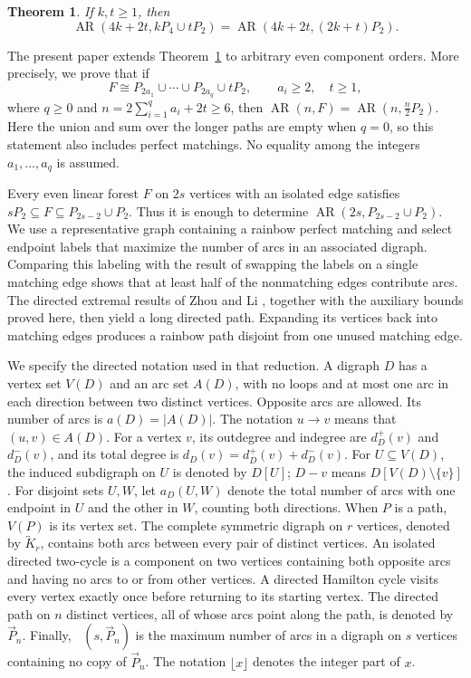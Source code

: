 \documentclass[12pt]{article}
\newtheorem{theorem}{Theorem}[section]
\DeclareMathOperator{\AR}{AR}
\DeclareMathOperator{\exdir}{ex_{dir}}
\newcommand{\dP}{\overrightarrow{P}}
\newcommand{\sK}{\overleftrightarrow{K}}
\begin{document}
\begin{theorem}{\rm\cite{GJJLP}}\label{lem:published-p4}
If $k,t\ge1$, then
\[
 \AR(4k+2t,kP_4\cup tP_2)=\AR(4k+2t,(2k+t)P_2).
\]
\end{theorem}

The present paper extends Theorem~\ref{lem:published-p4} to arbitrary even
component orders. More precisely, we prove that if
\[
 F\cong P_{2a_1}\cup\cdots\cup P_{2a_q}\cup tP_2,
 \qquad a_i\ge2,\quad t\ge1,
\]
where $q\ge0$ and $n=2\sum_{i=1}^{q}a_i+2t\ge6$, then
$\AR(n,F)=\AR(n,\frac{n}{2}P_2)$. Here the union and sum over the longer
paths are empty when $q=0$, so this statement also includes perfect
matchings. No equality among the integers $a_1,\ldots,a_q$ is assumed.

Every even linear forest $F$ on $2s$ vertices with an isolated edge satisfies
$sP_2\subseteq F\subseteq P_{2s-2}\cup P_2$. Thus it is enough to determine
$\AR(2s,P_{2s-2}\cup P_2)$. We use a representative graph containing a
rainbow perfect matching and select endpoint labels that maximize the
number of arcs in an associated digraph. Comparing this labeling with
the result of swapping the labels on a single matching edge shows that
at least half of the nonmatching edges contribute arcs. The directed
extremal results of Zhou and Li \cite{ZL}, together with the auxiliary
bounds proved here, then yield a long directed path. Expanding its
vertices back into matching edges produces a rainbow path disjoint
from one unused matching edge.

We specify the directed notation used in that reduction. A digraph $D$
has a vertex set $V(D)$ and an arc set $A(D)$, with no loops and at most
one arc in each direction between two distinct vertices. Opposite arcs
are allowed. Its number of arcs is $a(D)=|A(D)|$.
The notation $u\to v$ means that $(u,v)\in A(D)$.
For a vertex $v$, its outdegree and indegree are $d_D^+(v)$ and $d_D^-(v)$,
and its total degree is $d_D(v)=d_D^+(v)+d_D^-(v)$.
For $U\subseteq V(D)$, the induced subdigraph on $U$ is denoted by $D[U]$;
$D-v$ means $D[V(D)\setminus\{v\}]$.
For disjoint sets $U,W$, let $a_D(U,W)$ denote the total number of arcs
with one endpoint in $U$ and the other in $W$, counting both directions.
When $P$ is a path, $V(P)$ is its vertex set.
The complete symmetric digraph on $r$ vertices, denoted by $\sK_r$,
contains both arcs between every pair of distinct vertices.
An isolated directed two-cycle is a component on two vertices containing
both opposite arcs and having no arcs to or from other vertices.
A directed Hamilton cycle visits every vertex
exactly once before returning to its starting vertex.
The directed path on $n$ distinct vertices, all of whose arcs point along
the path, is denoted by $\dP_n$.
Finally, $\exdir(s,\dP_n)$ is the maximum number of arcs in a digraph on
$s$ vertices containing no copy of $\dP_n$.
The notation $\lfloor x\rfloor$ denotes the integer part of $x$.
\end{document}
